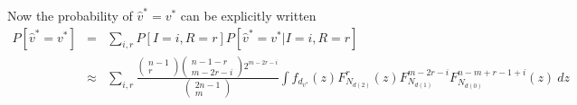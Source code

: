 \documentclass{article}
\begin{document}
Now the probability of $\hat{v}^* = v^*$ can be explicitly written
\begin{eqnarray*}
P[\hat{v}^* = v^*]
&=& \sum_{i,r} P[I=i,R=r]P[\hat{v}^* = v^*|I=i,R=r]
\\
&\approx&
	\sum_{i,r} \frac{\left(\begin{matrix}n-1\\r \end{matrix}\right) \left(\begin{matrix}n-1-r\\m-2r-i \end{matrix}\right)2^{m-2r-i}}
{\left(\begin{matrix}2n-1\\m \end{matrix}\right)}
		\int f_{d_{v^*}}(z) F_{N_{d(2)}}^r(z) F_{N_{d(1)}}^{m-2r-i} F_{N_{d(0)}}^{n-m+r-1+i}(z) \ dz
\end{eqnarray*}
\end{document}
